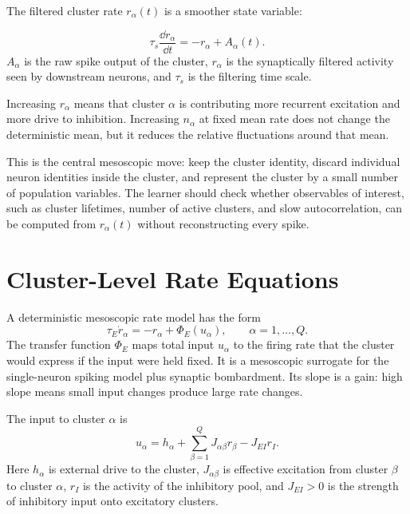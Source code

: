 The filtered cluster rate $r_{\alpha}(t)$ is a smoother state variable:
%
\begin{keyequation}
\begin{equation}
  \tau_s \frac{\dd r_{\alpha}}{\dd t}
  =
  -r_{\alpha} + A_{\alpha}(t).
  \label{eq:filtered-cluster-rate}
\end{equation}
\tcblower
$A_{\alpha}$ is the raw spike output of the cluster, $r_{\alpha}$ is the synaptically filtered activity seen by downstream neurons, and $\tau_s$ is the filtering time scale.
\end{keyequation}

\noindent Increasing $r_{\alpha}$ means that cluster $\alpha$ is contributing more recurrent excitation and more drive to inhibition. Increasing $n_{\alpha}$ at fixed mean rate does not change the deterministic mean, but it reduces the relative fluctuations around that mean.

This is the central mesoscopic move: keep the cluster identity, discard individual neuron identities inside the cluster, and represent the cluster by a small number of population variables. The learner should check whether observables of interest, such as cluster lifetimes, number of active clusters, and slow autocorrelation, can be computed from $r_{\alpha}(t)$ without reconstructing every spike.

\section{Cluster-Level Rate Equations}
\label{sec:cluster-level-rate-equations}

A deterministic mesoscopic rate model has the form
%
\begin{equation}
  \tau_E \dot r_{\alpha}
  =
  -r_{\alpha}
  +
  \Phi_E(u_{\alpha}),
  \qquad
  \alpha=1,\ldots,Q .
  \label{eq:e-cluster-rate-equation}
\end{equation}
%
The transfer function $\Phi_E$ maps total input $u_{\alpha}$ to the firing rate that the cluster would express if the input were held fixed. It is a mesoscopic surrogate for the single-neuron spiking model plus synaptic bombardment. Its slope is a gain: high slope means small input changes produce large rate changes.

The input to cluster $\alpha$ is
%
\begin{equation}
  u_{\alpha}
  =
  h_{\alpha}
  +
  \sum_{\beta=1}^{Q} J_{\alpha\beta} r_{\beta}
  -
  J_{EI} r_I .
  \label{eq:e-cluster-input}
\end{equation}
%
Here $h_{\alpha}$ is external drive to the cluster, $J_{\alpha\beta}$ is effective excitation from cluster $\beta$ to cluster $\alpha$, $r_I$ is the activity of the inhibitory pool, and $J_{EI}>0$ is the strength of inhibitory input onto excitatory clusters.

